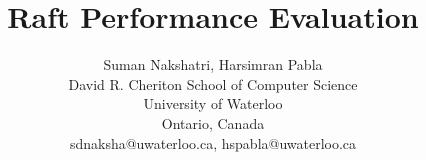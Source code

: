 \documentclass{sig-alternate-10pt}
\begin{document}
\setcounter{secnumdepth}{2}

\title{Raft Performance Evaluation}


\author{Suman Nakshatri, Harsimran Pabla \\David R. Cheriton School of Computer Science\\University of Waterloo\\Ontario, Canada\\ sdnaksha@uwaterloo.ca, hspabla@uwaterloo.ca}

\maketitle

















\end{document}
